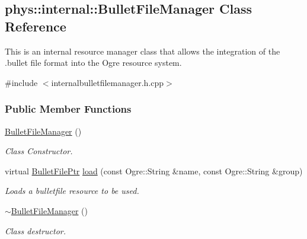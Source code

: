 \hypertarget{classphys_1_1internal_1_1BulletFileManager}{
\subsection{phys::internal::BulletFileManager Class Reference}
\label{classphys_1_1internal_1_1BulletFileManager}
}


This is an internal resource manager class that allows the integration of the .bullet file format into the Ogre resource system.  




{\ttfamily \#include $<$internalbulletfilemanager.h.cpp$>$}

\subsubsection*{Public Member Functions}
\begin{DoxyCompactItemize}
\item 
\hypertarget{classphys_1_1internal_1_1BulletFileManager_a93e2849b098764ef30b2933da5da9696}{
\hyperlink{classphys_1_1internal_1_1BulletFileManager_a93e2849b098764ef30b2933da5da9696}{BulletFileManager} ()}
\label{classphys_1_1internal_1_1BulletFileManager_a93e2849b098764ef30b2933da5da9696}

\begin{DoxyCompactList}\small\item\em Class Constructor. \item\end{DoxyCompactList}\item 
virtual \hyperlink{classphys_1_1internal_1_1BulletFilePtr}{BulletFilePtr} \hyperlink{classphys_1_1internal_1_1BulletFileManager_a7c2dff7475d112bd525c29882f731603}{load} (const Ogre::String \&name, const Ogre::String \&group)
\begin{DoxyCompactList}\small\item\em Loads a bulletfile resource to be used. \item\end{DoxyCompactList}\item 
\hypertarget{classphys_1_1internal_1_1BulletFileManager_a1554959d6fcbc1cbb23c7f09bffef023}{
\hyperlink{classphys_1_1internal_1_1BulletFileManager_a1554959d6fcbc1cbb23c7f09bffef023}{$\sim$BulletFileManager} ()}
\label{classphys_1_1internal_1_1BulletFileManager_a1554959d6fcbc1cbb23c7f09bffef023}

\begin{DoxyCompactList}\small\item\em Class destructor. \item\end{DoxyCompactList}\end{DoxyCompactItemize}
